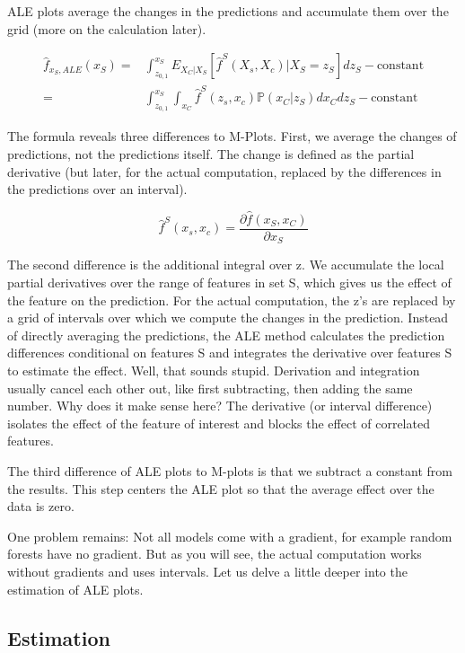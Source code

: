 \documentclass[
  12pt,
]{krantz}
\begin{document}
ALE plots average the changes in the predictions and accumulate them over the grid (more on the calculation later).

\begin{align*}\hat{f}_{x_S,ALE}(x_S)=&\int_{z_{0,1}}^{x_S}E_{X_C|X_S}\left[\hat{f}^S(X_s,X_c)|X_S=z_S\right]dz_S-\text{constant}\\=&\int_{z_{0,1}}^{x_S}\int_{x_C}\hat{f}^S(z_s,x_c)\mathbb{P}(x_C|z_S)d{}x_C{}dz_S-\text{constant}\end{align*}

The formula reveals three differences to M-Plots.
First, we average the changes of predictions, not the predictions itself.
The change is defined as the partial derivative (but later, for the actual computation, replaced by the differences in the predictions over an interval).

\[\hat{f}^S(x_s,x_c)=\frac{\partial\hat{f}(x_S,x_C)}{\partial{}x_S}\]

The second difference is the additional integral over z.
We accumulate the local partial derivatives over the range of features in set S, which gives us the effect of the feature on the prediction.
For the actual computation, the z's are replaced by a grid of intervals over which we compute the changes in the prediction.
Instead of directly averaging the predictions, the ALE method calculates the prediction differences conditional on features S and integrates the derivative over features S to estimate the effect.
Well, that sounds stupid.
Derivation and integration usually cancel each other out, like first subtracting, then adding the same number.
Why does it make sense here?
The derivative (or interval difference) isolates the effect of the feature of interest and blocks the effect of correlated features.

The third difference of ALE plots to M-plots is that we subtract a constant from the results.
This step centers the ALE plot so that the average effect over the data is zero.

One problem remains:
Not all models come with a gradient, for example random forests have no gradient.
But as you will see, the actual computation works without gradients and uses intervals.
Let us delve a little deeper into the estimation of ALE plots.

\hypertarget{estimation}{%
\subsection{Estimation}\label{estimation}}
\end{document}
